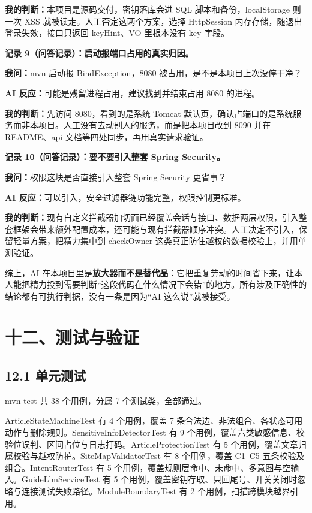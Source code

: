 \documentclass[zihao=-4,UTF8,openany]{ctexart}
\renewcommand{\_}{\textunderscore\allowbreak}
\begin{document}
\noindent\textbf{我的判断：}本项目是源码交付，密钥落库会进 SQL 脚本和备份，localStorage 则一次 XSS 就被读走。人工否定这两个方案，选择 HttpSession 内存存储，随退出登录失效，接口只返回 keyHint、VO 里根本没有 key 字段。

\noindent\textbf{记录 9（问答记录）：启动报端口占用的真实归因。}

\noindent\textbf{我问：}mvn 启动报 BindException，8080 被占用，是不是本项目上次没停干净？

\noindent\textbf{AI 反应：}可能是残留进程占用，建议找到并结束占用 8080 的进程。

\noindent\textbf{我的判断：}先访问 8080，看到的是系统 Tomcat 默认页，确认占端口的是系统服务而非本项目。人工没有去动别人的服务，而是把本项目改到 8090 并在 README、api 文档等四处同步，再用真实请求验证。

\noindent\textbf{记录 10（问答记录）：要不要引入整套 Spring Security。}

\noindent\textbf{我问：}权限这块是否直接引入整套 Spring Security 更省事？

\noindent\textbf{AI 反应：}可以引入，安全过滤器链功能完整，权限控制更标准。

\noindent\textbf{我的判断：}现有自定义拦截器加切面已经覆盖会话与接口、数据两层权限，引入整套框架会带来额外配置成本，还可能与现有拦截器顺序冲突。人工决定不引入，保留轻量方案，把精力集中到 checkOwner 这类真正防住越权的数据校验上，并用单测验证。

综上，AI 在本项目里是\textbf{放大器而不是替代品}：它把重复劳动的时间省下来，让本人能把精力投到需要判断“这段代码在什么情况下会错”的地方。所有涉及正确性的结论都有可执行判据，没有一条是因为“AI 这么说”就被接受。
\section*{\texorpdfstring{\textbf{十二、测试与验证}}{十二、测试与验证}}\label{ux5341ux4e00ux6d4bux8bd5ux4e0eux9a8cux8bc1}

\subsection*{\texorpdfstring{\textbf{12.1 单元测试}}{12.1 单元测试}}\label{ux5355ux5143ux6d4bux8bd5}

mvn test 共 38 个用例，分属 7 个测试类，全部通过。

ArticleStateMachineTest 有 4 个用例，覆盖 7 条合法边、非法组合、各状态可用动作与删除规则。SensitiveInfoDetectorTest 有 9 个用例，覆盖六类敏感信息、校验位误判、区间占位与日志打码。ArticleProtectionTest 有 5 个用例，覆盖文章归属校验与越权防护。SiteMapValidatorTest 有 8 个用例，覆盖 C1--C5 五条校验及组合。IntentRouterTest 有 5 个用例，覆盖规则层命中、未命中、多意图与空输入。GuideLlmServiceTest 有 5 个用例，覆盖密钥存取、只回尾号、开关关闭时忽略与连接测试失败路径。ModuleBoundaryTest 有 2 个用例，扫描跨模块越界引用。
\end{document}
